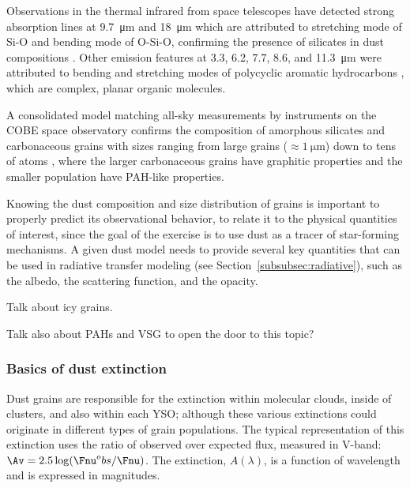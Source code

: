 Observations in the thermal infrared from space telescopes have detected strong absorption lines at \SI{9.7}{\micro\meter} and \SI{18}{\micro\meter} which are attributed to stretching mode of Si-O and bending mode of O-Si-O, confirming the presence of silicates in dust compositions \citep{Weingartner:2001du}. Other emission features at 3.3, 6.2, 7.7, 8.6, and \SI{11.3}{\micro\meter} \citep{Sellgren:1994vz} were attributed to bending and stretching modes of polycyclic aromatic hydrocarbons \citep[PAH, see][]{Gillett:1973bh,Allamandola:1985cf}, which are complex, planar organic molecules.
 
A consolidated model matching all-sky measurements by instruments on the COBE space observatory confirms the composition of amorphous silicates and carbonaceous grains with sizes ranging from large grains ($\approx\SI{1}{\micro\meter}$) down to tens of atoms \citep{Li:2001gk}, where the larger carbonaceous grains have graphitic properties and the smaller population have PAH-like properties.






Knowing the dust composition and size distribution of grains is important to properly predict its observational behavior, to relate it to the physical quantities of interest, since the goal of the exercise is to use dust as a tracer of star-forming mechanisms. A given dust model needs to provide several key quantities that can be used in radiative transfer modeling (see Section~\ref{subsubsec:radiative}), such as the albedo, the scattering function, and the opacity.

Talk about icy grains.


Talk also about PAHs and VSG to open the door to this topic?
\subsubsection{Basics of dust extinction}

Dust grains are responsible for the extinction within molecular clouds, inside of clusters, and also within each YSO; although these various extinctions could originate in different types of grain populations. The typical representation of this extinction uses the ratio of observed over expected flux, measured in V-band: $\Av = 2.5\log(\Fnu^obs/\Fnu)$. The extinction, $A(\lambda)$, is a function of wavelength and is expressed in magnitudes.

